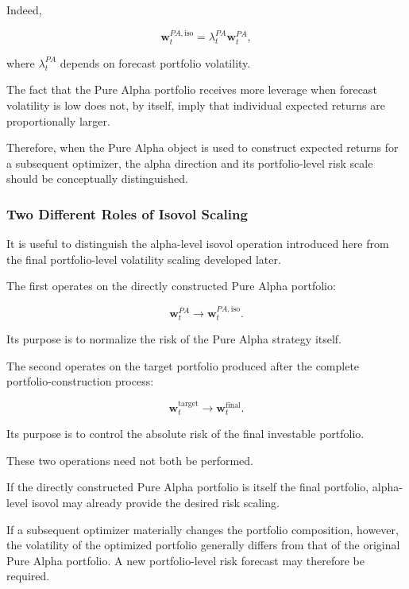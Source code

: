 \documentclass[11pt,a4paper]{article}
\begin{document}
Indeed,

\begin{equation}
\mathbf{w}_t^{PA,\mathrm{iso}}
=
\lambda_t^{PA}
\mathbf{w}_t^{PA},
\end{equation}

where $\lambda_t^{PA}$ depends on forecast portfolio volatility.

The fact that the Pure Alpha portfolio receives more leverage when forecast
volatility is low does not, by itself, imply that individual expected returns
are proportionally larger.

Therefore, when the Pure Alpha object is used to construct expected returns for
a subsequent optimizer, the alpha direction and its portfolio-level risk scale
should be conceptually distinguished.


\subsubsection{Two Different Roles of Isovol Scaling}

It is useful to distinguish the alpha-level isovol operation introduced here
from the final portfolio-level volatility scaling developed later.

The first operates on the directly constructed Pure Alpha portfolio:

\begin{equation}
\boxed{
\mathbf{w}_t^{PA}
\rightarrow
\mathbf{w}_t^{PA,\mathrm{iso}}.
}
\end{equation}

Its purpose is to normalize the risk of the Pure Alpha strategy itself.

The second operates on the target portfolio produced after the complete
portfolio-construction process:

\begin{equation}
\boxed{
\mathbf{w}_t^{\mathrm{target}}
\rightarrow
\mathbf{w}_t^{\mathrm{final}}.
}
\end{equation}

Its purpose is to control the absolute risk of the final investable portfolio.

These two operations need not both be performed.

If the directly constructed Pure Alpha portfolio is itself the final portfolio,
alpha-level isovol may already provide the desired risk scaling.

If a subsequent optimizer materially changes the portfolio composition,
however, the volatility of the optimized portfolio generally differs from that
of the original Pure Alpha portfolio. A new portfolio-level risk forecast may
therefore be required.
\end{document}
